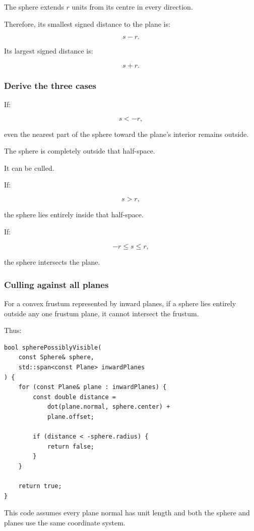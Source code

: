 The sphere extends \(r\) units from its centre in every direction.

Therefore, its smallest signed distance to the plane is:

\[
 s-r.
\]

Its largest signed distance is:

\[
 s+r.
\]

\subsubsection{Derive the three cases}\label{derive-the-three-cases}

If:

\[
 \boxed{s<-r},
\]

even the nearest part of the sphere toward the plane's interior remains outside.

The sphere is completely outside that half-space.

It can be culled.

If:

\[
 \boxed{s>r},
\]

the sphere lies entirely inside that half-space.

If:

\[
 \boxed{-r\le s\le r},
\]

the sphere intersects the plane.

\subsubsection{Culling against all planes}\label{culling-against-all-planes}

For a convex frustum represented by inward planes, if a sphere lies entirely outside any one frustum plane, it cannot intersect the frustum.

Thus:

\begin{verbatim}
bool spherePossiblyVisible(
    const Sphere& sphere,
    std::span<const Plane> inwardPlanes
) {
    for (const Plane& plane : inwardPlanes) {
        const double distance =
            dot(plane.normal, sphere.center) +
            plane.offset;

        if (distance < -sphere.radius) {
            return false;
        }
    }

    return true;
}
\end{verbatim}

This code assumes every plane normal has unit length and both the sphere and planes use the same coordinate system.

